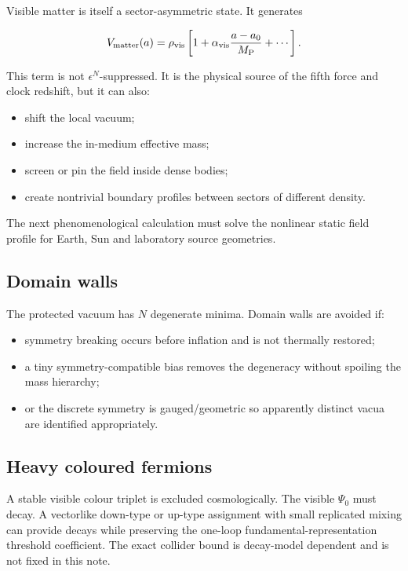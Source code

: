 \documentclass[11pt,a4paper]{article}
\providecommand{\tightlist}{\setlength{\itemsep}{0pt}\setlength{\parskip}{0pt}}
\begin{document}
Visible matter is itself a sector-asymmetric state. It generates

\[
V_{\rm matter}(a)
=\rho_{\rm vis}
\left[
1+\alpha_{\rm vis}\frac{a-a_0}{M_{\rm P}}+\cdots
\right].
\]

This term is not \(\epsilon^N\)-suppressed. It is the physical source of
the fifth force and clock redshift, but it can also:

\begin{itemize}
\tightlist
\item
  shift the local vacuum;
\item
  increase the in-medium effective mass;
\item
  screen or pin the field inside dense bodies;
\item
  create nontrivial boundary profiles between sectors of different
  density.
\end{itemize}

The next phenomenological calculation must solve the nonlinear static
field profile for Earth, Sun and laboratory source geometries.

\subsection{Domain walls}\label{domain-walls}

The protected vacuum has \(N\) degenerate minima. Domain walls are
avoided if:

\begin{itemize}
\tightlist
\item
  symmetry breaking occurs before inflation and is not thermally
  restored;
\item
  a tiny symmetry-compatible bias removes the degeneracy without
  spoiling the mass hierarchy;
\item
  or the discrete symmetry is gauged/geometric so apparently distinct
  vacua are identified appropriately.
\end{itemize}

\subsection{Heavy coloured fermions}\label{heavy-coloured-fermions}

A stable visible colour triplet is excluded cosmologically. The visible
\(\Psi_0\) must decay. A vectorlike down-type or up-type assignment with
small replicated mixing can provide decays while preserving the one-loop
fundamental-representation threshold coefficient. The exact collider
bound is decay-model dependent and is not fixed in this note.
\end{document}
